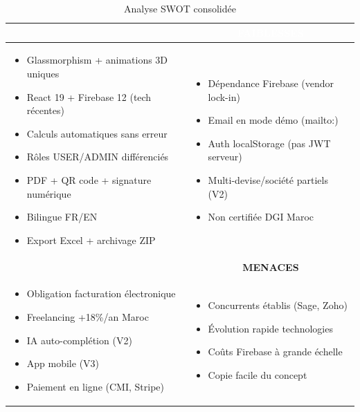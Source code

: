 \begin{table}[H]
\centering
\caption{Analyse SWOT consolidée}
\label{tab:swot}
\begin{tabular}{|p{}|p{}|}
\hline
\rowcolor{emsiblue}\multicolumn{1}{|c|}{\textcolor{white}{\textbf{FORCES}}} & \multicolumn{1}{c|}{\textcolor{white}{\textbf{FAIBLESSES}}} \\
\hline
\begin{itemize}[leftmargin=*, noitemsep]
    \item Glassmorphism + animations 3D uniques
    \item React 19 + Firebase 12 (tech récentes)
    \item Calculs automatiques sans erreur
    \item Rôles USER/ADMIN différenciés
    \item PDF + QR code + signature numérique
    \item Bilingue FR/EN
    \item Export Excel + archivage ZIP
\end{itemize}
&
\begin{itemize}[leftmargin=*, noitemsep]
    \item Dépendance Firebase (vendor lock-in)
    \item Email en mode démo (mailto:)
    \item Auth localStorage (pas JWT serveur)
    \item Multi-devise/société partiels (V2)
    \item Non certifiée DGI Maroc
\end{itemize}
\\
\hline
\rowcolor{lightblue}\multicolumn{1}{|c|}{\textbf{OPPORTUNITÉS}} & \multicolumn{1}{c|}{\textbf{MENACES}} \\
\hline
\begin{itemize}[leftmargin=*, noitemsep]
    \item Obligation facturation électronique
    \item Freelancing +18\%/an Maroc
    \item IA auto-complétion (V2)
    \item App mobile (V3)
    \item Paiement en ligne (CMI, Stripe)
\end{itemize}
&
\begin{itemize}[leftmargin=*, noitemsep]
    \item Concurrents établis (Sage, Zoho)
    \item Évolution rapide technologies
    \item Coûts Firebase à grande échelle
    \item Copie facile du concept
\end{itemize}
\\
\hline
\end{tabular}
\end{table}


